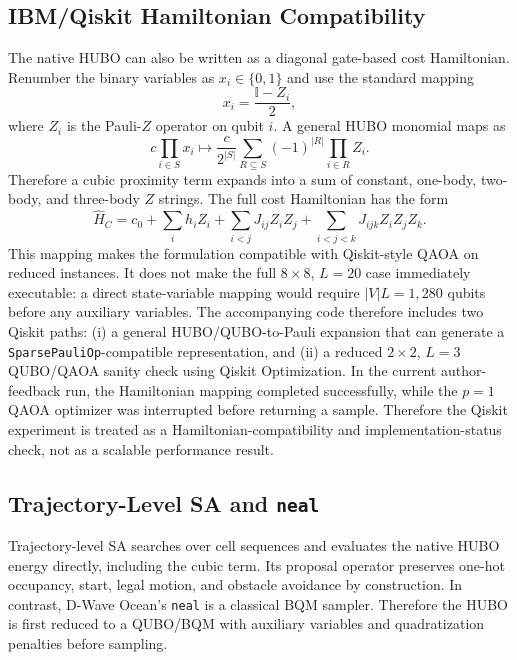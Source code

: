 \documentclass[10pt,conference]{IEEEtran}
\begin{document}
\subsection{IBM/Qiskit Hamiltonian Compatibility}
The native HUBO can also be written as a diagonal gate-based cost Hamiltonian. Renumber the binary variables as $x_i\in\{0,1\}$ and use the standard mapping
\begin{equation}
    x_i=\frac{\mathbb{I}-Z_i}{2},
\end{equation}
where $Z_i$ is the Pauli-$Z$ operator on qubit $i$. A general HUBO monomial maps as
\begin{equation}
    c\prod_{i\in S}x_i \mapsto \frac{c}{2^{|S|}}\sum_{R\subseteq S}(-1)^{|R|}\prod_{i\in R}Z_i .
    \label{eq:pauli_mapping}
\end{equation}
Therefore a cubic proximity term expands into a sum of constant, one-body, two-body, and three-body $Z$ strings. The full cost Hamiltonian has the form
\begin{equation}
\hat{H}_C=c_0+\sum_i h_iZ_i+\sum_{i<j}J_{ij}Z_iZ_j+
\sum_{i<j<k}J_{ijk}Z_iZ_jZ_k .
\end{equation}
This mapping makes the formulation compatible with Qiskit-style QAOA on reduced instances. It does not make the full $8\times8$, $L=20$ case immediately executable: a direct state-variable mapping would require $|V|L=1,280$ qubits before any auxiliary variables. The accompanying code therefore includes two Qiskit paths: (i) a general HUBO/QUBO-to-Pauli expansion that can generate a \texttt{SparsePauliOp}-compatible representation, and (ii) a reduced $2\times2$, $L=3$ QUBO/QAOA sanity check using Qiskit Optimization. In the current author-feedback run, the Hamiltonian mapping completed successfully, while the $p=1$ QAOA optimizer was interrupted before returning a sample. Therefore the Qiskit experiment is treated as a Hamiltonian-compatibility and implementation-status check, not as a scalable performance result.


\subsection{Trajectory-Level SA and \texttt{neal}}
Trajectory-level SA searches over cell sequences and evaluates the native HUBO energy directly, including the cubic term. Its proposal operator preserves one-hot occupancy, start, legal motion, and obstacle avoidance by construction. In contrast, D-Wave Ocean's \texttt{neal} is a classical BQM sampler. Therefore the HUBO is first reduced to a QUBO/BQM with auxiliary variables and quadratization penalties before sampling.
\end{document}
